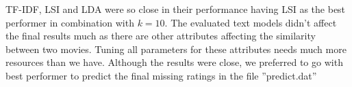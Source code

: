 \documentclass{sigish}
\begin{document}
TF-IDF, LSI and LDA were so close in their performance having LSI as the best performer in combination with $ k = 10 $. The evaluated text models didn't affect the final results much as there are other attributes affecting the similarity between two movies. Tuning all parameters for these attributes needs much more resources than we have. Although the results were close, we preferred to go with best performer to predict the final missing ratings in the file ''predict.dat''



\end{document}
